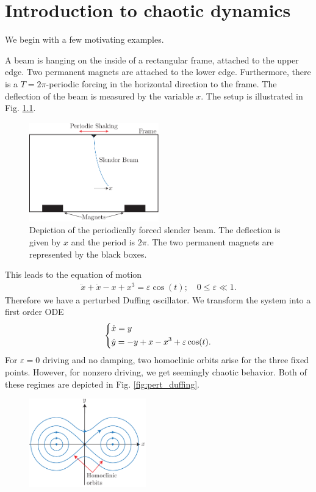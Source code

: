 \chapter{Introduction to chaotic dynamics}
We begin with a few motivating examples.
\begin{ex}
	A beam is hanging on the inside of a rectangular frame, attached to the upper edge. Two permanent magnets are attached to the lower edge. Furthermore, there is a $T=2 \pi $-periodic forcing in the horizontal direction to the frame. The deflection of the beam is measured by the variable $x$. The setup is illustrated in Fig. \ref{fig:forced_slender_beam}.
	\begin{figure}[h!]
		\centering
		\includegraphics[width=0.5\textwidth]{figures/ch6/1forced_slender_beam.pdf}
		\caption{Depiction of the periodically forced slender beam. The deflection is given by $x$ and the period is $2\pi$. The two permanent magnets are represented by the black boxes.}
		\label{fig:forced_slender_beam}
	\end{figure}
This leads to the equation of motion
\begin{align}
	\ddot{x} + \dot{x} - x + x^3 = \varepsilon \cos(t);\quad 0 \leq \varepsilon \ll 1.
\end{align}
Therefore we have a perturbed Duffing oscillator. We transform the system into a first order ODE
\begin{align}
	\begin{dcases}
		\dot{x} = y \\
		\dot{y} = -y +x - x^3 + \varepsilon \cos(t).
	\end{dcases}
\end{align}
For $\varepsilon =0$ driving and no damping, two homoclinic orbits arise for the three fixed points. However, for nonzero driving, we get seemingly chaotic behavior. Both of these regimes are depicted in Fig. \ref{fig:pert_duffing}.
\begin{figure}[h!]
	\centering
	\includegraphics[width=0.45\textwidth]{figures/ch6/3unpert_duffing.pdf}

\end{figure}
\end{ex}
